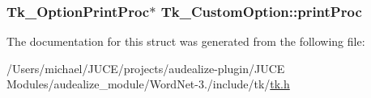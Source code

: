 \subsubsection[{\texorpdfstring{print\+Proc}{printProc}}]{\setlength{\rightskip}{0pt plus 5cm}Tk\+\_\+\+Option\+Print\+Proc$\ast$ Tk\+\_\+\+Custom\+Option\+::print\+Proc}\hypertarget{struct_tk___custom_option_a733c30edacbbec75301f524627af86ac}{}\label{struct_tk___custom_option_a733c30edacbbec75301f524627af86ac}


The documentation for this struct was generated from the following file\+:\begin{DoxyCompactItemize}
\item 
/\+Users/michael/\+J\+U\+C\+E/projects/audealize-\/plugin/\+J\+U\+C\+E Modules/audealize\+\_\+module/\+Word\+Net-\/3./include/tk/\hyperlink{tk_8h}{tk.\+h}\end{DoxyCompactItemize}

